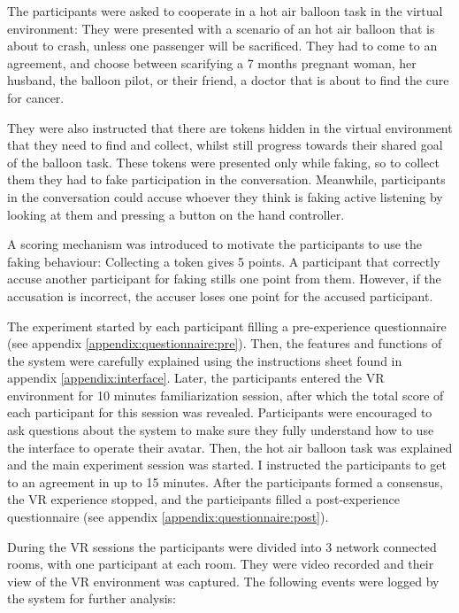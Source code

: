\documentclass[]{simple-thesis}
\begin{document}
The participants were asked to cooperate in a hot air balloon task \citep{Howes2012} in the virtual environment:
They were presented with a scenario of an hot air balloon that is about to crash, unless one passenger will be sacrificed.
They had to come to an agreement, and choose between scarifying a 7 months pregnant woman, her husband, the balloon pilot, or their friend, a doctor that is about to find the cure for cancer.

They were also instructed that there are tokens hidden in the virtual environment that they need to find and collect, whilst still progress towards their shared goal of the balloon task.
These tokens were presented only while faking, so to collect them they had to fake participation in the conversation.
Meanwhile, participants in the conversation could accuse whoever they think is faking active listening by looking at them and pressing a button on the hand controller.

A scoring mechanism was introduced to motivate the participants to use the faking behaviour:
Collecting a token gives 5 points.
A participant that correctly accuse another participant for faking stills one point from them.
However, if the accusation is incorrect, the accuser loses one point for the accused participant.

The experiment started by each participant filling a pre-experience questionnaire (see appendix \ref{appendix:questionnaire:pre}).
Then, the features and functions of the system were carefully explained using the instructions sheet found in appendix \ref{appendix:interface}.
Later, the participants entered the VR environment for 10 minutes familiarization session, after which the total score of each participant for this session was revealed.
Participants were encouraged to ask questions about the system to make sure they fully understand how to use the interface to operate their avatar.
Then, the hot air balloon task was explained and the main experiment session was started.
I instructed the participants to get to an agreement in up to 15 minutes.
After the participants formed a consensus, the VR experience stopped, and the participants filled a post-experience questionnaire (see appendix \ref{appendix:questionnaire:post}).

During the VR sessions the participants were divided into 3 network connected rooms, with one participant at each room.
They were video recorded and their view of the VR environment was captured.
The following events were logged by the system for further analysis:
\end{document}
